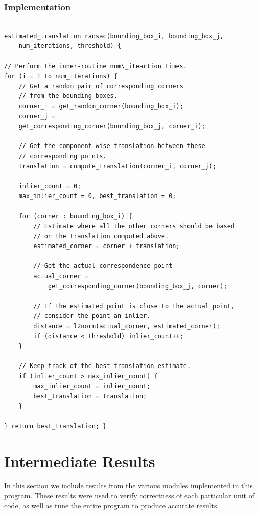 \documentclass{article}
\begin{document}
\subsubsection{Implementation}
\begin{minipage}{\textwidth}
\begin{lstlisting}

estimated_translation ransac(bounding_box_i, bounding_box_j,
	num_iterations, threshold) {

// Perform the inner-routine num\_iteartion times.
for (i = 1 to num_iterations) {
	// Get a random pair of corresponding corners
	// from the bounding boxes.
	corner_i = get_random_corner(bounding_box_i);
	corner_j =
	get_corresponding_corner(bounding_box_j, corner_i);
	
	// Get the component-wise translation between these
	// corresponding points.
	translation = compute_translation(corner_i, corner_j);
	
	inlier_count = 0;
	max_inlier_count = 0, best_translation = 0;
	
	for (corner : bounding_box_i) {
		// Estimate where all the other corners should be based
		// on the translation computed above.
		estimated_corner = corner + translation;
		
		// Get the actual correspondence point
		actual_corner =
			get_corresponding_corner(bounding_box_j, corner);
		
		// If the estimated point is close to the actual point,
		// consider the point an inlier.
		distance = l2norm(actual_corner, estimated_corner);
		if (distance < threshold) inlier_count++;
	}
	
	// Keep track of the best translation estimate.
	if (inlier_count > max_inlier_count) {
		max_inlier_count = inlier_count;
		best_translation = translation;
	}
		
} return best_translation; }

\end{lstlisting}
\end{minipage}

\section{Intermediate Results}
In this section we include results from the various modules implemented in this program.  These results were used to verify correctness of each particular unit of code, as well as tune the entire program to produce accurate results.
\end{document}

